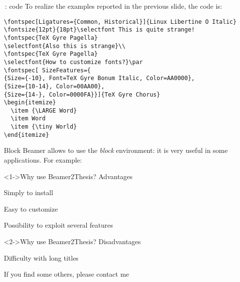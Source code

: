 \begin{frame}[t,fragile]{\XeLaTeX\,: code}
To realize the examples reported in the previous slide, the code is:
\scriptsize{
\begin{verbatim}
\fontspec[Ligatures={Common, Historical}]{Linux Libertine O Italic}
\fontsize{12pt}{18pt}\selectfont This is quite strange!
\fontspec{TeX Gyre Pagella}
\selectfont{Also this is strange}\\
\fontspec{TeX Gyre Pagella}
\selectfont{How to customize fonts?}\par
\fontspec[ SizeFeatures={
{Size={-10}, Font=TeX Gyre Bonum Italic, Color=AA0000},
{Size={10-14}, Color=00AA00},
{Size={14-}, Color=0000FA}}]{TeX Gyre Chorus}
\begin{itemize}
  \item {\LARGE Word}
  \item Word
  \item {\tiny World}
\end{itemize}
\end{verbatim}
}
\end{frame}

\begin{tframe}{Block}
Beamer allows to use the \emph{block} environment: it is very useful in some applications. For example:
\begin{block}<1->{Why use Beamer2Thesis? Advantages}
\begin{adv}
\item Simply to install
\item Easy to customize
\item Possibility to exploit several features
\end{adv}
\end{block}
\begin{block}<2->{Why use Beamer2Thesis? Disadvantages}
\begin{disadv}
\item Difficulty with long titles
\item If you find some others, please contact me 
\end{disadv}
\end{block}
\end{tframe}

